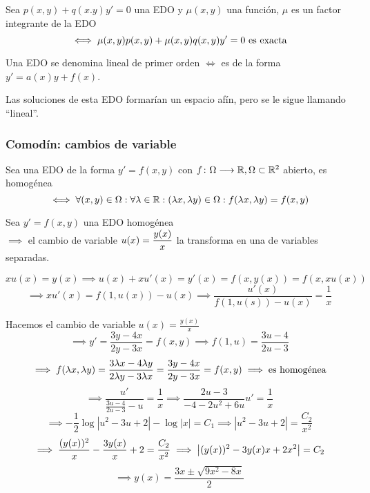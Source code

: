 \begin{defn}
	Sea $p(x,y) + q(x.y)y'=0$ una EDO y $\mu(x,y)$ una función, $\mu$ es un factor integrante de la EDO
	\[\iff \mu(x,y)p(x,y)+\mu(x,y)q(x,y)y'=0 \text{ es exacta}\]
\end{defn}
\begin{defn}
	Una EDO se denomina lineal de primer orden $\iff$ es de la forma $y'=a(x)y+f(x)$.

	Las soluciones de esta EDO formarían un espacio afín, pero se le sigue llamando ``lineal''.
\end{defn}
\subsubsection{Comodín: cambios de variable}
\begin{defn}
	Sea una EDO de la forma $y'=f(x,y)$ con $f \colon \Omega \longrightarrow \mathbb{R}, \Omega \subset \mathbb{R}^2$ abierto, es homogénea
	\[\iff \forall (x, y) \in \Omega : \forall \lambda\in \mathbb{R} : (\lambda x, \lambda y) \in \Omega : f(\lambda x, \lambda y) = f(x,y)\]
\end{defn}

\begin{prop}
	Sea $y'=f(x,y)$ una EDO homogénea \\
	$\implies$ el cambio de variable $\displaystyle u(x)=\frac{y(x)}{x}$ la transforma en una de variables separadas.
	\begin{dem}
		$xu(x)=y(x) \implies u(x)+xu'(x)=y'(x)=f(x, y(x))=f(x, xu(x))$
		\[\implies xu'(x)=f(1, u(x))-u(x) \implies \frac{u'(x)}{f(1, u(s))-u(x)}=\frac{1}{x}\]
	\end{dem}
\end{prop}
\begin{ejem}[$4x-3y+y'(2y-3x)=0$]
	Hacemos el cambio de variable $u(x)=\frac{y(x)}{x}$
	\[\implies y'=\frac{3y-4x}{2y-3x}=f(x,y) \implies f(1, u)=\frac{3u-4}{2u-3}\]
	\[\implies f(\lambda x, \lambda y)=\frac{3\lambda x-4\lambda y}{2\lambda y-3\lambda x}=\frac{3y-4x}{2y-3x}=f(x,y) \implies \text{es homogénea}\]
	\[\implies \frac{u'}{\frac{3u-4}{2u-3}-u}=\frac{1}{x} \implies \frac{2u-3}{-4-2u^2+6u}u'=\frac{1}{x}\]
	\[\implies -\frac{1}{2}\log{|u^2-3u+2|}-\log{|x|}=C_1 \implies |u^2-3u+2|=\frac{C_2}{x^2}\]
	\[\implies \frac{(y(x))^2}{x}-\frac{3y(x)}{x}+2=\frac{C_2}{x^2} \implies \left|(y(x))^2-3y(x)x+2x^2\right|=C_2\]
	\[\implies \boxed{y(x)=\frac{3x\pm \sqrt{9x^2-8x}}{2}}\]
\end{ejem}

